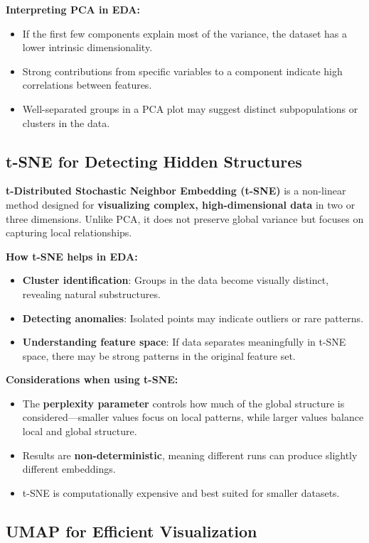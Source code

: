 \documentclass[12pt,openany, draft]{book}
\begin{document}
\textbf{Interpreting PCA in EDA:}
\begin{itemize}
    \item If the first few components explain most of the variance, the dataset has a lower intrinsic dimensionality.
    \item Strong contributions from specific variables to a component indicate high correlations between features.
    \item Well-separated groups in a PCA plot may suggest distinct subpopulations or clusters in the data.
\end{itemize}

\subsection{t-SNE for Detecting Hidden Structures}

\textbf{t-Distributed Stochastic Neighbor Embedding (t-SNE)} is a non-linear method designed for \textbf{visualizing complex, high-dimensional data} in two or three dimensions. Unlike PCA, it does not preserve global variance but focuses on capturing local relationships.

\textbf{How t-SNE helps in EDA:}
\begin{itemize}
    \item \textbf{Cluster identification}: Groups in the data become visually distinct, revealing natural substructures.
    \item \textbf{Detecting anomalies}: Isolated points may indicate outliers or rare patterns.
    \item \textbf{Understanding feature space}: If data separates meaningfully in t-SNE space, there may be strong patterns in the original feature set.
\end{itemize}

\textbf{Considerations when using t-SNE:}
\begin{itemize}
    \item The \textbf{perplexity parameter} controls how much of the global structure is considered—smaller values focus on local patterns, while larger values balance local and global structure.
    \item Results are \textbf{non-deterministic}, meaning different runs can produce slightly different embeddings.
    \item t-SNE is computationally expensive and best suited for smaller datasets.
\end{itemize}

\subsection{UMAP for Efficient Visualization}
\end{document}
